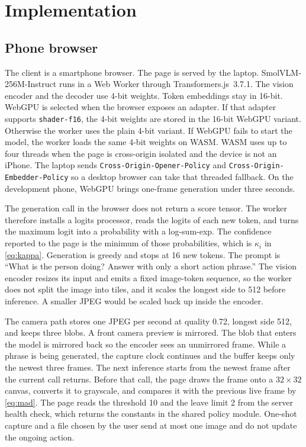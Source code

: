\section{Implementation}
\label{sec:implementation}

\subsection{Phone browser}

The client is a smartphone browser. The page is served by the laptop.
SmolVLM-256M-Instruct runs in a Web Worker through Transformers.js~3.7.1.
The vision encoder and the decoder use 4-bit weights. Token embeddings stay
in 16-bit. WebGPU is selected when the browser exposes an adapter. If that
adapter supports \texttt{shader-f16}, the 4-bit weights are stored in the
16-bit WebGPU variant. Otherwise the worker uses the plain 4-bit variant.
If WebGPU fails to start the model, the worker loads the same 4-bit weights
on WASM. WASM uses up to four threads when the page is cross-origin
isolated and the device is not an iPhone. The laptop sends
\texttt{Cross-Origin-Opener-Policy} and
\texttt{Cross-Origin-Embedder-Policy} so a desktop browser can take that
threaded fallback. On the development phone, WebGPU brings one-frame
generation under three seconds.

The generation call in the browser does not return a score tensor. The
worker therefore installs a logits processor, reads the logits of each new
token, and turns the maximum logit into a probability with a log-sum-exp.
The confidence reported to the page is the minimum of those probabilities,
which is $\kappa_i$ in \eqref{eq:kappa}. Generation is greedy and stops at
16 new tokens. The prompt is ``What is the person doing? Answer with only a
short action phrase.'' The vision encoder resizes its input and emits a
fixed image-token sequence, so the worker does not split the image into
tiles, and it scales the longest side to 512 before inference. A smaller
JPEG would be scaled back up inside the encoder.

The camera path stores one JPEG per second at quality 0.72, longest side
512, and keeps three blobs. A front camera preview is mirrored. The blob
that enters the model is mirrored back so the encoder sees an unmirrored
frame. While a phrase is being generated, the capture clock continues and
the buffer keeps only the newest three frames. The next inference starts
from the newest frame after the current call returns. Before that call,
the page draws the frame onto a \(32\times 32\) canvas, converts it to
grayscale, and compares it with the previous live frame by
\eqref{eq:mad}. The page reads the threshold 10 and the leave limit 2 from
the server health check, which returns the constants in the shared policy
module. One-shot capture and a file chosen by the user send at most one
image and do not update the ongoing action.

